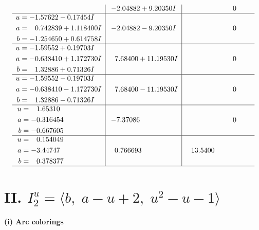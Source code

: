 \documentclass[1p]{elsarticle_modified}
\theoremstyle{definition}
\begin{document}
$$\begin{array}{c|c|c}
 & -2.04882 + 9.20350 I & \phantom{-0.000000 } 0 \\ \hline\begin{aligned}
u &= -1.57622 - 0.17454 I \\
a &= \phantom{-}0.742839 + 1.118400 I \\
b &= -1.254650 + 0.614758 I\end{aligned}
 & -2.04882 - 9.20350 I & \phantom{-0.000000 } 0 \\ \hline\begin{aligned}
u &= -1.59552 + 0.19703 I \\
a &= -0.638410 + 1.172730 I \\
b &= \phantom{-}1.32886 + 0.71326 I\end{aligned}
 & \phantom{-}7.68400 + 11.19530 I & \phantom{-0.000000 } 0 \\ \hline\begin{aligned}
u &= -1.59552 - 0.19703 I \\
a &= -0.638410 - 1.172730 I \\
b &= \phantom{-}1.32886 - 0.71326 I\end{aligned}
 & \phantom{-}7.68400 - 11.19530 I & \phantom{-0.000000 } 0 \\ \hline\begin{aligned}
u &= \phantom{-}1.65310\phantom{ +0.000000I} \\
a &= -0.316454\phantom{ +0.000000I} \\
b &= -0.667605\phantom{ +0.000000I}\end{aligned}
 & -7.37086\phantom{ +0.000000I} & \phantom{-0.000000 } 0 \\ \hline\begin{aligned}
u &= \phantom{-}0.154049\phantom{ +0.000000I} \\
a &= -3.44747\phantom{ +0.000000I} \\
b &= \phantom{-}0.378377\phantom{ +0.000000I}\end{aligned}
 & \phantom{-}0.766693\phantom{ +0.000000I} & \phantom{-}13.5400\phantom{ +0.000000I}\\
 \hline 
 \end{array}$$\newpage\newpage\renewcommand{\arraystretch}{1}
\centering \section*{II. $I^u_{2}= \langle b,\;a- u+2,\;u^2- u-1 \rangle$}
\flushleft \textbf{(i) Arc colorings}\\
\end{document}
